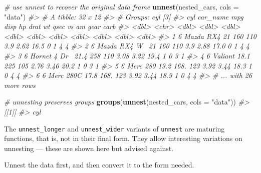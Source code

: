 \documentclass[]{book}
\newenvironment{Shaded}{}{}
\newcommand{\CommentTok}[1]{\textcolor[rgb]{0.38,0.63,0.69}{\textit{#1}}}
\newcommand{\DataTypeTok}[1]{\textcolor[rgb]{0.56,0.13,0.00}{#1}}
\newcommand{\KeywordTok}[1]{\textcolor[rgb]{0.00,0.44,0.13}{\textbf{#1}}}
\newcommand{\NormalTok}[1]{#1}
\newcommand{\StringTok}[1]{\textcolor[rgb]{0.25,0.44,0.63}{#1}}
\begin{document}
\begin{Shaded}
\begin{Highlighting}[]
\CommentTok{# use unnest to recover the original data frame}
\KeywordTok{unnest}\NormalTok{(nested_cars, }\DataTypeTok{cols =} \StringTok{"data"}\NormalTok{)}
\CommentTok{#> # A tibble: 32 x 12}
\CommentTok{#> # Groups:   cyl [3]}
\CommentTok{#>     cyl car_name       mpg  disp    hp  drat    wt  qsec    vs    am  gear  carb}
\CommentTok{#>   <dbl> <chr>        <dbl> <dbl> <dbl> <dbl> <dbl> <dbl> <dbl> <dbl> <dbl> <dbl>}
\CommentTok{#> 1     6 Mazda RX4     21    160    110  3.9   2.62  16.5     0     1     4     4}
\CommentTok{#> 2     6 Mazda RX4 W~  21    160    110  3.9   2.88  17.0     0     1     4     4}
\CommentTok{#> 3     6 Hornet 4 Dr~  21.4  258    110  3.08  3.22  19.4     1     0     3     1}
\CommentTok{#> 4     6 Valiant       18.1  225    105  2.76  3.46  20.2     1     0     3     1}
\CommentTok{#> 5     6 Merc 280      19.2  168.   123  3.92  3.44  18.3     1     0     4     4}
\CommentTok{#> 6     6 Merc 280C     17.8  168.   123  3.92  3.44  18.9     1     0     4     4}
\CommentTok{#> # ... with 26 more rows}

\CommentTok{# unnesting preserves groups}
\KeywordTok{groups}\NormalTok{(}\KeywordTok{unnest}\NormalTok{(nested_cars, }\DataTypeTok{cols =} \StringTok{"data"}\NormalTok{))}
\CommentTok{#> [[1]]}
\CommentTok{#> cyl}
\end{Highlighting}
\end{Shaded}

The \texttt{unnest\_longer} and \texttt{unnest\_wider} variants of \texttt{unnest} are maturing functions, that is, not in their final form. They allow interesting variations on unnesting --- these are shown here but advised against.

Unnest the data first, and then convert it to the form needed.
\end{document}
